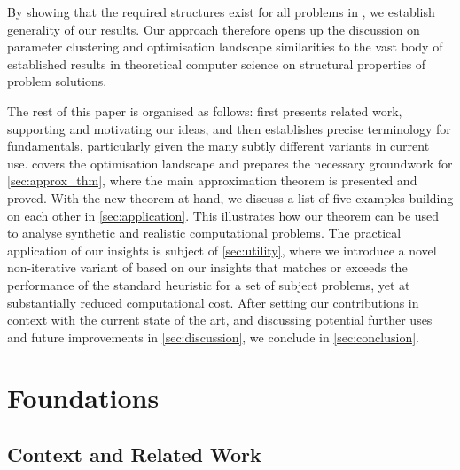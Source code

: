 By showing that the required structures exist for all 
problems in \NP, we establish generality of our results.
Our approach therefore opens up the discussion on parameter 
clustering and optimisation landscape similarities to the vast body 
of established results in theoretical computer science on structural 
properties of problem solutions. 

The rest of this paper is organised as follows: 
 first presents related work, supporting and 
motivating our ideas, and then establishes precise 
terminology for \QAOA fundamentals, particularly given the many subtly 
different variants in current use.  covers 
the \QAOA optimisation landscape and prepares the necessary groundwork 
for \cref{sec:approx_thm}, where the main approximation theorem is 
presented and proved. With the new theorem at hand, we discuss a list 
of five examples building on each other in \cref{sec:application}. This 
illustrates how our theorem can be used to analyse synthetic and realistic 
computational problems. The practical application of our insights is
subject of \cref{sec:utility}, where we introduce a novel non-iterative variant of \QAOA based on our insights that matches or exceeds the performance of the standard 
heuristic for a set of subject problems, yet at substantially reduced computational cost. After setting our contributions
in context with the current state of the art, and discussing potential 
further uses and future improvements in \cref{sec:discussion}, we
conclude in \cref{sec:conclusion}.


\section{Foundations}\label{sec:foundations}
\subsection{Context and Related Work}\label{sec:relatedwork}

